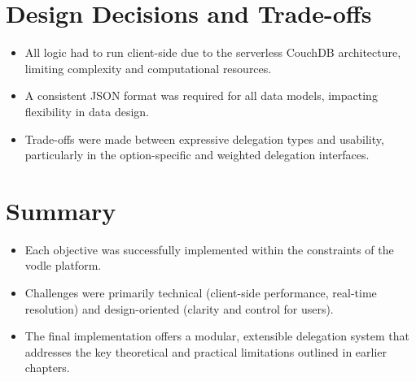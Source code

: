 \section{Design Decisions and Trade-offs}
\begin{itemize}
  \item All logic had to run client-side due to the serverless CouchDB architecture, limiting complexity and computational resources.
  \item A consistent JSON format was required for all data models, impacting flexibility in data design.
  \item Trade-offs were made between expressive delegation types and usability, particularly in the option-specific and weighted delegation interfaces.
\end{itemize}

\section{Summary}
\begin{itemize}
  \item Each objective was successfully implemented within the constraints of the vodle platform.
  \item Challenges were primarily technical (client-side performance, real-time resolution) and design-oriented (clarity and control for users).
  \item The final implementation offers a modular, extensible delegation system that addresses the key theoretical and practical limitations outlined in earlier chapters.
\end{itemize}

